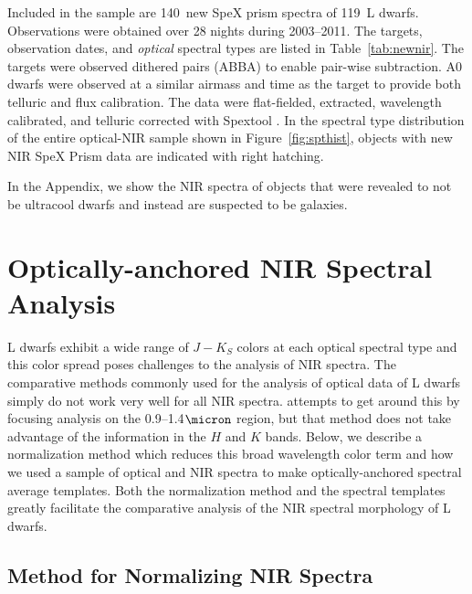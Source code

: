 \documentclass[12pt,preprint]{aastex}
\newcommand{\NewPrismSpectra}{140} %
\newcommand{\NewPrismObjects}{119} %
\begin{document}
Included in the sample are \NewPrismSpectra~new SpeX prism spectra of \NewPrismObjects~L dwarfs.
Observations were obtained over 28 nights during 2003--2011. The targets, observation dates, and \emph{optical} spectral types are listed in Table~\ref{tab:newnir}.
The targets were observed dithered pairs (ABBA) to enable pair-wise subtraction. A0 dwarfs were observed at a similar airmass and time as the target to provide both telluric and flux calibration.
The data were flat-fielded, extracted, wavelength calibrated, and telluric corrected with Spextool \citep{Cushing04,Spextool2}.
In the spectral type distribution of the entire optical-NIR sample shown in Figure~\ref{fig:spthist}, objects with new NIR SpeX Prism data are indicated with right hatching.

In the Appendix, we show the NIR spectra of objects that were revealed to not be ultracool dwarfs and instead are suspected to be galaxies.

\clearpage
\section{Optically-anchored NIR Spectral Analysis}

L dwarfs exhibit a wide range of $J-K_S$ colors at each optical spectral type \cite[e.g.,][]{Kirkpatrick08, Schmidt10, Faherty:2012cy} and this color spread poses challenges to the analysis of NIR spectra.
The comparative methods commonly used for the analysis of optical data of L dwarfs simply do not work very well for all NIR spectra.
\citet{Kirkpatrick10} attempts to get around this by focusing analysis on the 0.9--1.4$\micron$ region, but that method does not take advantage of the information in the $H$ and $K$ bands.
Below, we describe a normalization method which reduces this broad wavelength color term and how we used a sample of optical and NIR spectra to make optically-anchored spectral average templates.
Both the normalization method and the spectral templates greatly facilitate the comparative analysis of the NIR spectral morphology of L dwarfs.

\subsection{Method for Normalizing NIR Spectra}
\label{sec:method}
\end{document}
